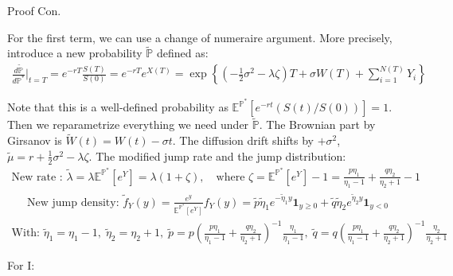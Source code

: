 \documentclass{beamer}
\begin{document}
\begin{frame}{Proof Con.}

    
    {\footnotesize \scriptsize
    \par For the first term, we can use a change of numeraire argument. More precisely, introduce a new probability \(\tilde{\mathbb{P}}\) defined as:
     {\footnotesize \tiny
    \begin{align*}
        \frac{d \tilde{\mathbb{P}}}{d \mathbb{P}^*} \bigg|_{t=T} = e^{-rT} \frac{S(T)}{S(0)} = e^{-rT} e^{X(T)} 
    = \exp \left\{ \left( -\frac{1}{2} \sigma^2 - \lambda \zeta \right) T + \sigma W(T) + \sum_{i=1}^{N(T)} Y_i \right\}
    \end{align*}
    }
    \par \pause  Note that this is a well-defined probability as $\mathbb{E}^{\mathbb{P}^*}[e^{-rt}(S(t)/S(0))] = 1$. Then we 
    reparametrize everything we need under  \(\tilde{\mathbb{P}}\). The Brownian part by Girsanov is $\tilde{W}(t) = W(t) - \sigma t$. 
    The diffusion drift shifts by \(+\sigma^2\), $\tilde{\mu} = r + \frac{1}{2}\sigma^2 - \lambda\zeta$. 
    The modified jump rate and the jump distribution: \pause 
    {\footnotesize \tiny
    \begin{align*}
        \text{New rate : } \tilde{\lambda} = \lambda\mathbb{E}^{\mathbb{P}^*}[e^Y] 
        = \lambda(1 + \zeta), \quad \text{where } \zeta = \mathbb{E}^{\mathbb{P}^*}[e^Y] - 1 = \frac{p\eta_1}{\eta_1 - 1} + \frac{q\eta_2}{\eta_2 + 1} - 1
    \end{align*}
    }
    \vspace{-2em}
    {\footnotesize \tiny
    \begin{align*}
        \text{New jump density: }\tilde{f}_Y(y) = \frac{e^y}{\mathbb{E}^{\mathbb{P}^*}[e^Y]} f_Y(y) 
        = \tilde{p}\tilde{\eta}_1 e^{-\tilde{\eta}_1 y}\mathbf{1}_{y\geq 0} + \tilde{q}\tilde{\eta}_2 e^{\tilde{\eta}_2 y}\mathbf{1}_{y<0}
    \end{align*}
    }
     \vspace{-2em}
    {\footnotesize \tiny
    \begin{align*}
        \text{With: } \tilde{\eta}_1 = \eta_1 - 1,\;\tilde{\eta}_2 = \eta_2 + 1,\;\tilde{p} = p\left(\frac{p\eta_1}{\eta_1 - 1}
         + \frac{q\eta_2}{\eta_2 + 1}\right)^{-1} \frac{\eta_1}{\eta_1 - 1},
         \; \tilde{q} = q\left(\frac{p\eta_1}{\eta_1 - 1} + \frac{q\eta_2}{\eta_2 + 1}\right)^{-1} \frac{\eta_2}{\eta_2 + 1}
    \end{align*}
    }
    \par  \pause For I:
}
\end{frame}
\end{document}
